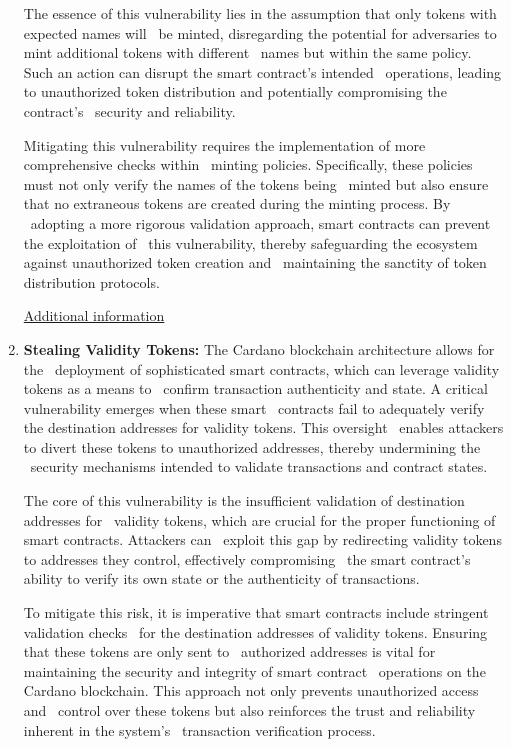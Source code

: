 \documentclass{scrreport}
\begin{document}
\begin{enumerate}
    The essence of this vulnerability lies in the assumption that only tokens with expected names will \
    be minted, disregarding the potential for adversaries to mint additional tokens with different \
    names but within the same policy. Such an action can disrupt the smart contract's intended \
    operations, leading to unauthorized token distribution and potentially compromising the contract's \
    security and reliability.\

    Mitigating this vulnerability requires the implementation of more comprehensive checks within \
    minting policies. Specifically, these policies must not only verify the names of the tokens being \
    minted but also ensure that no extraneous tokens are created during the minting process. By \
    adopting a more rigorous validation approach, smart contracts can prevent the exploitation of \
    this vulnerability, thereby safeguarding the ecosystem against unauthorized token creation and \
    maintaining the sanctity of token distribution protocols.\

    \href{https://github.com/input-output-hk/Certification-working-group/blob/vuln-from-audits/Cardano%20Threat%20Intelligence/Vulnerabilities/CTI-2023-ADA-11-02.md}{Additional information}

    \item \textbf{Stealing Validity Tokens:} The Cardano blockchain architecture allows for the \
    deployment of sophisticated smart contracts, which can leverage validity tokens as a means to \
    confirm transaction authenticity and state. A critical vulnerability emerges when these smart \
    contracts fail to adequately verify the destination addresses for validity tokens. This oversight \
    enables attackers to divert these tokens to unauthorized addresses, thereby undermining the \
    security mechanisms intended to validate transactions and contract states.\

    The core of this vulnerability is the insufficient validation of destination addresses for \
    validity tokens, which are crucial for the proper functioning of smart contracts. Attackers can \
    exploit this gap by redirecting validity tokens to addresses they control, effectively compromising \
    the smart contract's ability to verify its own state or the authenticity of transactions.\

    To mitigate this risk, it is imperative that smart contracts include stringent validation checks \
    for the destination addresses of validity tokens. Ensuring that these tokens are only sent to \
    authorized addresses is vital for maintaining the security and integrity of smart contract \
    operations on the Cardano blockchain. This approach not only prevents unauthorized access and \
    control over these tokens but also reinforces the trust and reliability inherent in the system's \
    transaction verification process.\


\end{enumerate}
\end{document}
